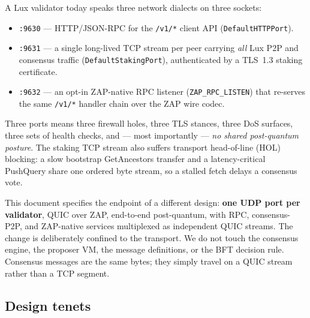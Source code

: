\documentclass[11pt,a4paper]{article}
\newcommand{\msg}[1]{\textsf{#1}}
\newcommand{\code}[1]{\texttt{#1}}
\begin{document}
A Lux validator today speaks three network dialects on three sockets:

\begin{itemize}[nosep]
  \item \code{:9630} --- HTTP/JSON-RPC for the \code{/v1/*} client API
        (\code{DefaultHTTPPort}).
  \item \code{:9631} --- a single long-lived TCP stream per peer carrying
        \emph{all} Lux P2P and consensus traffic
        (\code{DefaultStakingPort}), authenticated by a TLS~1.3 staking
        certificate.
  \item \code{:9632} --- an opt-in ZAP-native RPC listener
        (\code{ZAP\_RPC\_LISTEN}) that re-serves the same \code{/v1/*}
        handler chain over the ZAP wire codec.
\end{itemize}

Three ports means three firewall holes, three TLS stances, three
DoS surfaces, three sets of health checks, and --- most importantly ---
\emph{no shared post-quantum posture}. The staking TCP stream also
suffers transport head-of-line (HOL) blocking: a slow bootstrap
\msg{GetAncestors} transfer and a latency-critical \msg{PushQuery} share
one ordered byte stream, so a stalled fetch delays a consensus vote.

This document specifies the endpoint of a different design: \textbf{one
UDP port per validator}, QUIC over ZAP, end-to-end post-quantum, with
RPC, consensus-P2P, and ZAP-native services multiplexed as independent
QUIC streams. The change is deliberately confined to the transport. We
do not touch the consensus engine, the proposer VM, the message
definitions, or the BFT decision rule. Consensus messages are the same
bytes; they simply travel on a QUIC stream rather than a TCP segment.

\subsection{Design tenets}
\end{document}

